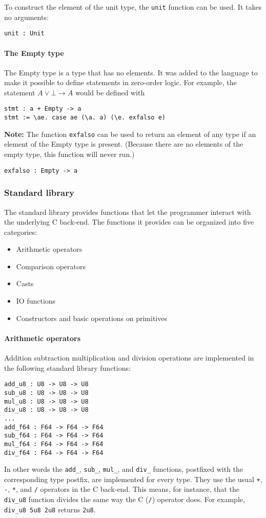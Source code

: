\documentclass[12pt]{article}
\begin{document}
To construct the element of the unit type, the \verb$unit$ function can be used.
It takes no arguments:
\begin{lstlisting}
unit : Unit
\end{lstlisting}

\paragraph{The Empty type} The Empty type is a type that has no elements. It was
added to the language to make it possible to define statements in zero-order
logic. For example, the statement $A \vee \bot \rightarrow A$ would be defined
with
\begin{lstlisting}
stmt : a + Empty -> a
stmt := \ae. case ae (\a. a) (\e. exfalso e)
\end{lstlisting}
\textbf{Note:} The function \verb$exfalso$ can be used to return an element of
any type if an element of the Empty type is present. (Because there are no
elements of the empty type, this function will never run.)
\begin{lstlisting}
exfalso : Empty -> a
\end{lstlisting}

\subsubsection{Standard library}

The standard library provides functions that let the programmer interact with
the underlying C back-end. The functions it provides can be organized into five
categories:
\begin{itemize}
    \item Arithmetic operators
    \item Comparison operators
    \item Casts
    \item IO functions
    \item Constructors and basic operations on primitives
\end{itemize}

\paragraph{Arithmetic operators} Addition subtraction multiplication and
division operations are implemented in the following standard library functions:
\begin{lstlisting}
add_u8 : U8 -> U8 -> U8
sub_u8 : U8 -> U8 -> U8
mul_u8 : U8 -> U8 -> U8
div_u8 : U8 -> U8 -> U8
...
add_f64 : F64 -> F64 -> F64
sub_f64 : F64 -> F64 -> F64
mul_f64 : F64 -> F64 -> F64
div_f64 : F64 -> F64 -> F64
\end{lstlisting}
In other words the \verb$add_$, \verb$sub_$, \verb$mul_$, and \verb$div_$
functions, postfixed with the corresponding type postfix, are implemented for
every type. They use the usual \verb$+$, \verb$-$, \verb$*$, and \verb$/$
operators in the C back-end. This means, for instance, that the \verb$div_u8$
function divides the same way the C (\verb$/$) operator does. For example,
\verb$div_u8 5u8 2u8$ returns \verb$2u8$.
\end{document}

